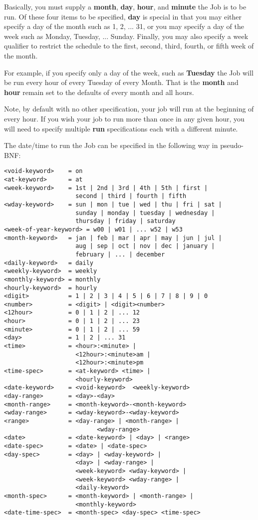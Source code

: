 \begin{description}
Basically, you must supply a {\bf month}, {\bf day}, {\bf hour}, and  {\bf
minute} the Job is to be run. Of these four items to be specified,  {\bf day}
is special in that you may either specify a day of the month  such as 1, 2,
... 31, or you may specify a day of the week such  as Monday, Tuesday, ...
Sunday. Finally, you may also specify a  week qualifier to restrict the
schedule to the first, second, third,  fourth, or fifth week of the month.

For example, if you specify only a day of the week, such as {\bf Tuesday}  the
Job will be run every hour of every Tuesday of every Month. That  is the {\bf
month} and {\bf hour} remain set to the defaults of  every month and all
hours.

Note, by default with no other specification, your job will run  at the
beginning of every hour. If you wish your job to run more than  once in any
given hour, you will need to specify multiple {\bf run}  specifications each
with a different minute.

The date/time to run the Job can be specified in the following way  in
pseudo-BNF:

\footnotesize
\begin{verbatim}
<void-keyword>    = on
<at-keyword>      = at
<week-keyword>    = 1st | 2nd | 3rd | 4th | 5th | first |
                    second | third | fourth | fifth
<wday-keyword>    = sun | mon | tue | wed | thu | fri | sat |
                    sunday | monday | tuesday | wednesday |
                    thursday | friday | saturday
<week-of-year-keyword> = w00 | w01 | ... w52 | w53
<month-keyword>   = jan | feb | mar | apr | may | jun | jul |
                    aug | sep | oct | nov | dec | january |
                    february | ... | december
<daily-keyword>   = daily
<weekly-keyword>  = weekly
<monthly-keyword> = monthly
<hourly-keyword>  = hourly
<digit>           = 1 | 2 | 3 | 4 | 5 | 6 | 7 | 8 | 9 | 0
<number>          = <digit> | <digit><number>
<12hour>          = 0 | 1 | 2 | ... 12
<hour>            = 0 | 1 | 2 | ... 23
<minute>          = 0 | 1 | 2 | ... 59
<day>             = 1 | 2 | ... 31
<time>            = <hour>:<minute> |
                    <12hour>:<minute>am |
                    <12hour>:<minute>pm
<time-spec>       = <at-keyword> <time> |
                    <hourly-keyword>
<date-keyword>    = <void-keyword>  <weekly-keyword>
<day-range>       = <day>-<day>
<month-range>     = <month-keyword>-<month-keyword>
<wday-range>      = <wday-keyword>-<wday-keyword>
<range>           = <day-range> | <month-range> |
                          <wday-range>
<date>            = <date-keyword> | <day> | <range>
<date-spec>       = <date> | <date-spec>
<day-spec>        = <day> | <wday-keyword> |
                    <day> | <wday-range> |
                    <week-keyword> <wday-keyword> |
                    <week-keyword> <wday-range> |
                    <daily-keyword>
<month-spec>      = <month-keyword> | <month-range> |
                    <monthly-keyword>
<date-time-spec>  = <month-spec> <day-spec> <time-spec>
\end{verbatim}
\normalsize

\end{description}

